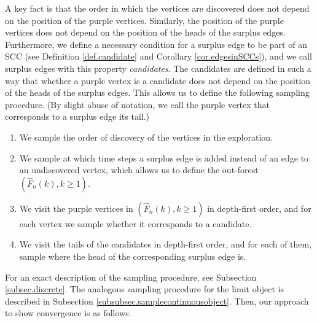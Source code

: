 A key fact is that the order in which the vertices are discovered does not depend on the position of the purple vertices. Similarly, the position of the purple vertices does not depend on the position of the heads of the surplus edges. Furthermore, we define a necessary condition for a surplus edge to be part of an SCC (see Definition \ref{def.candidate} and Corollary \ref{cor.edgesinSCCs}), and we call surplus edges with this property \emph{candidates}. The candidates are defined in such a way that whether a purple vertex is a candidate does not depend on the position of the heads of the surplus edges. This allows us to define the following sampling procedure. (By slight abuse of notation, we call the purple vertex that corresponds to a surplus edge its tail.)
\begin{enumerate}
    \item We sample the order of discovery of the vertices in the exploration.
    \item We sample at which time steps a surplus edge is added instead of an edge to an undiscovered vertex, which allows us to define the out-forest $(\hat{F}_n(k),k\geq 1)$. 
    \item We visit the purple vertices in $(\hat{F}_n(k),k\geq 1)$ in depth-first order, and for each vertex we sample whether it corresponds to a candidate.
    \item We visit the tails of the candidates in depth-first order, and for each of them, sample where the head of the corresponding surplus edge is.
\end{enumerate}
For an exact description of the sampling procedure, see Subsection \ref{subsec.discrete}. The analogous sampling procedure for the limit object is described in Subsection \ref{subsubsec.samplecontinuousobject}. Then, our approach to show convergence is as follows.

